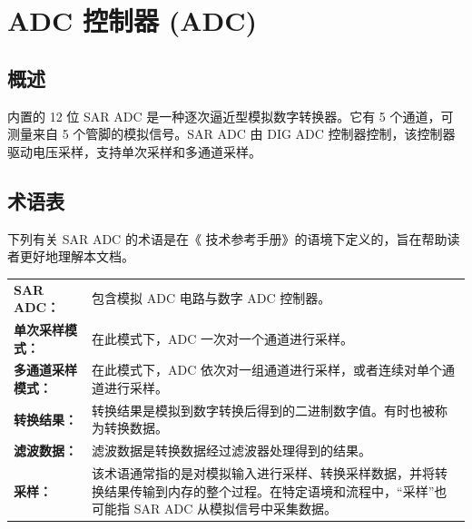 \documentclass[main\_\_CN.tex]{subfiles}
\begin{document}

\ifglobal
\else
    {\let\clearpage\relax \listoftodos}
    {\let\clearpage\relax \listofdonetodos}
    \tableofcontents
\fi



\hypertarget{adc}{}
\chapter{ADC 控制器 (ADC)}
\label{mod:adc}

\section{概述}

\chipname{} 内置的 12 位 SAR ADC 是一种逐次逼近型模拟数字转换器。它有 5 个通道，可测量来自 5 个管脚的模拟信号。SAR ADC 由 DIG ADC 控制器控制，该控制器驱动电压采样，支持单次采样和多通道采样。

\section{术语表}

下列有关 SAR ADC 的术语是在《\chipname{} 技术参考手册》的语境下定义的，旨在帮助读者更好地理解本文档。

\begin{longtable}{ R{4cm} p{11cm} }
\textbf{SAR ADC：} & 包含模拟 ADC 电路与数字 ADC 控制器。\\
\textbf{单次采样模式：} & 在此模式下，ADC 一次对一个通道进行采样。 \\
\textbf{多通道采样模式：} & 在此模式下，ADC 依次对一组通道进行采样，或者连续对单个通道进行采样。\\
\textbf{转换结果：} & 转换结果是模拟到数字转换后得到的二进制数字值。有时也被称为转换数据。\\
\textbf{滤波数据：} & 滤波数据是转换数据经过滤波器处理得到的结果。 \\
\textbf{采样：} & 该术语通常指的是对模拟输入进行采样、转换采样数据，并将转换结果传输到内存的整个过程。在特定语境和流程中，“采样”也可能指 SAR ADC 从模拟信号中采集数据。\\
\end{longtable}
\end{document}
